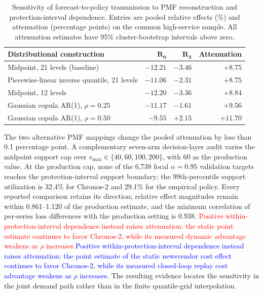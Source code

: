 \documentclass[msom,dblanonrev]{informs4}
\newcommand{\add}[1]{\textcolor{blue}{#1}}
\newcommand{\reduce}[1]{\textcolor{red}{#1}\hspace{0.5em}}
\begin{document}
\begin{table}[ht]
\caption{Sensitivity of forecast-to-policy transmission to PMF reconstruction and protection-interval dependence. Entries are pooled relative effects (\%) and attenuation (percentage points) on the common high-service sample. All attenuation estimates have 95\% cluster-bootstrap intervals above zero.}\label{tab:distribution-sensitivity}
\centering\small
\begin{tabular}{lrrr}
\toprule
\textbf{Distributional construction} & $\boldsymbol{R_0}$ & $\boldsymbol{R_3}$ & \textbf{Attenuation} \\
\midrule
Midpoint, 21 levels (baseline) & $-12.21$ & $-3.46$ & $+8.75$ \\
Piecewise-linear inverse quantile, 21 levels & $-11.06$ & $-2.31$ & $+8.75$ \\
Midpoint, 12 levels & $-12.20$ & $-3.36$ & $+8.84$ \\
Gaussian copula AR(1), $\rho=0.25$ & $-11.17$ & $-1.61$ & $+9.56$ \\
Gaussian copula AR(1), $\rho=0.50$ & $-9.55$ & $+2.15$ & $+11.70$ \\
\bottomrule
\end{tabular}
\end{table}

The two alternative PMF mappings change the pooled attenuation by less than 0.1 percentage point.
A complementary seven-arm decision-layer audit varies the midpoint support cap over $v_{\max}\in\{40,60,100,200\}$, with 60 as the production value.
At the production cap, none of the 6{,}738 focal $\alpha=0.95$ validation targets reaches the protection-interval support boundary; the 99th-percentile support utilization is 32.4\% for Chronos-2 and 29.1\% for the empirical policy.
Every reported comparison retains its direction; relative effect magnitudes remain within 0.861--1.120 of the production estimate, and the minimum correlation of per-series loss differences with the production setting is 0.938.
\reduce{Positive within-protection-interval dependence instead raises attenuation: the static point estimate continues to favor Chronos-2, while its measured dynamic advantage weakens as $\rho$ increases.}\add{Positive within-protection-interval dependence instead raises attenuation: the point estimate of the static newsvendor cost effect continues to favor Chronos-2, while its measured closed-loop replay cost advantage weakens as $\rho$ increases.}
The resulting evidence locates the sensitivity in the joint demand path rather than in the finite quantile-grid interpolation.
\end{document}
